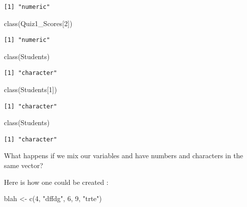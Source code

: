\documentclass[
  letterpaper,
  DIV=11,
  numbers=noendperiod]{scrreprt}
\newenvironment{Shaded}{\begin{snugshade}}{\end{snugshade}}
\newcommand{\DecValTok}[1]{\textcolor[rgb]{0.68,0.00,0.00}{#1}}
\newcommand{\FunctionTok}[1]{\textcolor[rgb]{0.28,0.35,0.67}{#1}}
\newcommand{\NormalTok}[1]{\textcolor[rgb]{0.00,0.23,0.31}{#1}}
\newcommand{\OtherTok}[1]{\textcolor[rgb]{0.00,0.23,0.31}{#1}}
\newcommand{\StringTok}[1]{\textcolor[rgb]{0.13,0.47,0.30}{#1}}
\begin{document}
\begin{verbatim}
[1] "numeric"
\end{verbatim}

\begin{Shaded}
\begin{Highlighting}[]
\FunctionTok{class}\NormalTok{(Quiz1\_Scores[}\DecValTok{2}\NormalTok{])}
\end{Highlighting}
\end{Shaded}

\begin{verbatim}
[1] "numeric"
\end{verbatim}

\begin{Shaded}
\begin{Highlighting}[]
\FunctionTok{class}\NormalTok{(Students)}
\end{Highlighting}
\end{Shaded}

\begin{verbatim}
[1] "character"
\end{verbatim}

\begin{Shaded}
\begin{Highlighting}[]
\FunctionTok{class}\NormalTok{(Students[}\DecValTok{1}\NormalTok{])}
\end{Highlighting}
\end{Shaded}

\begin{verbatim}
[1] "character"
\end{verbatim}

\begin{Shaded}
\begin{Highlighting}[]
\FunctionTok{class}\NormalTok{(Students)}
\end{Highlighting}
\end{Shaded}

\begin{verbatim}
[1] "character"
\end{verbatim}

What happens if we mix our variables and have numbers and characters in
the same vector?

Here is how one could be created :

\begin{Shaded}
\begin{Highlighting}[]
\NormalTok{blah }\OtherTok{\textless{}{-}} \FunctionTok{c}\NormalTok{(}\DecValTok{4}\NormalTok{, }\StringTok{"dffdg"}\NormalTok{, }\DecValTok{6}\NormalTok{, }\DecValTok{9}\NormalTok{, }\StringTok{"trte"}\NormalTok{)}
\end{Highlighting}
\end{Shaded}
\end{document}
